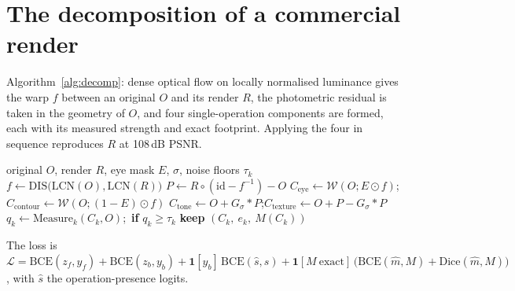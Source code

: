 \documentclass[10pt]{article}
\begin{document}
\section{The decomposition of a commercial render}
\label{sec:decomp}
Algorithm~\ref{alg:decomp}: dense optical flow on locally normalised luminance gives the warp $f$ between an original $O$ and its
render $R$, the photometric residual is taken in the geometry of $O$, and four single-operation components are formed, each with
its measured strength and exact footprint. Applying the four in sequence reproduces $R$ at 108\,dB PSNR.
\begin{algorithm}[H]
\caption{Single-operation components of a commercial render}
\label{alg:decomp}
\begin{algorithmic}[1]
\Require original $O$, render $R$, eye mask $E$, $\sigma$, noise floors $\tau_k$
\State $f\gets\mathrm{DIS}\big(\mathrm{LCN}(O),\mathrm{LCN}(R)\big)$
\State $P\gets R\circ(\mathrm{id}-f^{-1}) - O$
\State $C_\text{eye}\gets\mathcal{W}(O;E\odot f)$;\quad $C_\text{contour}\gets\mathcal{W}(O;(1-E)\odot f)$
\State $C_\text{tone}\gets O+G_\sigma*P$;\quad $C_\text{texture}\gets O+P-G_\sigma*P$
  \State $q_k\gets\mathrm{Measure}_k(C_k,O)$;\ \textbf{if} $q_k\ge\tau_k$ \textbf{keep} $(C_k,\ e_k,\ M(C_k))$
\EndFor
\end{algorithmic}
\end{algorithm}
The loss is $\mathcal{L}=\mathrm{BCE}(z_f,y_f)+\mathrm{BCE}(z_b,y_b)+\mathbf{1}[y_b]\,\mathrm{BCE}(\hat s,s)+\mathbf{1}[M\
\text{exact}]\,\big(\mathrm{BCE}(\hat m,M)+\mathrm{Dice}(\hat m,M)\big)$, with $\hat s$ the operation-presence logits.
\end{document}
